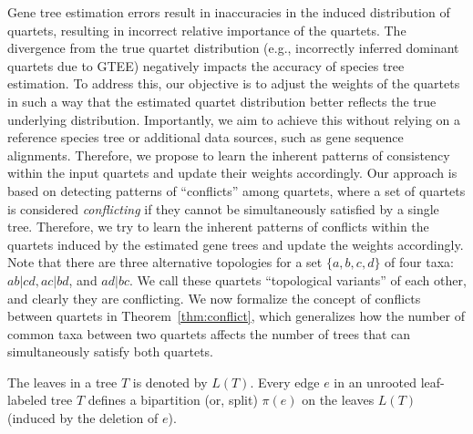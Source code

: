 \documentclass[10pt,a4paper]{article}
\begin{document}
Gene tree estimation errors result in inaccuracies in the induced distribution of quartets, resulting in incorrect relative importance of the quartets. %
The divergence from the true quartet distribution (e.g., incorrectly inferred dominant quartets due to GTEE) negatively impacts the accuracy of species tree estimation. To address this, our objective is to adjust the weights of the quartets in such a way that the estimated quartet distribution better reflects the true underlying distribution. Importantly, we aim to achieve this without relying on a reference species tree or additional data sources, such as gene sequence alignments. Therefore, we propose to learn the inherent patterns of consistency within the input quartets and update their weights accordingly. Our approach is based on detecting patterns of ``conflicts'' among quartets, where a set of quartets is considered \textit{conflicting} if they cannot be simultaneously satisfied by a single tree. Therefore, we try to learn the inherent patterns of conflicts within the quartets induced by the estimated gene trees and update the weights accordingly. Note that there are three alternative topologies for a set $\{a,b,c,d\}$ of four taxa: $ab|cd, ac|bd$, and $ad|bc$. We call these quartets ``topological variants'' of each other, and clearly they are conflicting. We now formalize the concept of conflicts between quartets in Theorem~\ref{thm:conflict}, which generalizes how the number of common taxa between two quartets affects the number of trees that can simultaneously satisfy both quartets.


The leaves in a tree $T$ is denoted by $L(T)$.
Every edge $e$ in an unrooted leaf-labeled tree $T$ defines a bipartition (or, split) $\pi(e)$ on the leaves $L(T)$ (induced by the deletion of $e$). 
\end{document}
